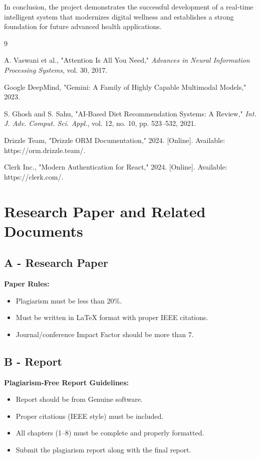 \documentclass[12pt,a4paper]{report}
\begin{document}
In conclusion, the project demonstrates the successful development of a real-time intelligent system that modernizes digital wellness and establishes a strong foundation for future advanced health applications.


\renewcommand{\bibname}{Bibliography}
\begin{thebibliography}{9}

A. Vaswani et al., "Attention Is All You Need," \textit{Advances in Neural Information Processing Systems}, vol. 30, 2017.

Google DeepMind, "Gemini: A Family of Highly Capable Multimodal Models," 2023.

S. Ghosh and S. Sahu, "AI-Based Diet Recommendation Systems: A Review," \textit{Int. J. Adv. Comput. Sci. Appl.}, vol. 12, no. 10, pp. 523–532, 2021.

Drizzle Team, "Drizzle ORM Documentation," 2024. [Online]. Available: https://orm.drizzle.team/.

Clerk Inc., "Modern Authentication for React," 2024. [Online]. Available: https://clerk.com/.

\end{thebibliography}

\newpage
\appendix
\chapter{Research Paper and Related Documents}

\section*{A - Research Paper}
\textbf{Paper Rules:}
\begin{itemize}
    \item Plagiarism must be less than 20\%.
    \item Must be written in LaTeX format with proper IEEE citations.
    \item Journal/conference Impact Factor should be more than 7.
\end{itemize}

\newpage
\section*{B - Report}
\textbf{Plagiarism-Free Report Guidelines:}
\begin{itemize}
    \item Report should be from Genuine software.
    \item Proper citations (IEEE style) must be included.
    \item All chapters (1–8) must be complete and properly formatted.
    \item Submit the plagiarism report along with the final report.
\end{itemize}
\end{document}
